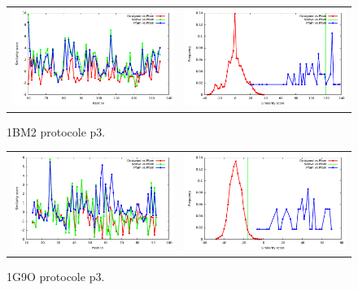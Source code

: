\documentclass[a4paper,12pt]{article}
\begin{document}
   \begin{figure}[t]
     \centering
     \begin{tabular}{cc}
       \includegraphics[width=8.45cm]{gen_08032012/1BM2/p3/similarity_bypos.pdf} &
       \includegraphics[width=8.45cm]{gen_08032012/1BM2/p3/similarity_byseq_frequency.pdf} \\
     \end{tabular}

     \caption{1BM2 protocole p3.}
     \label{1ABO}
   \end{figure}
   \begin{figure}[t]
     \centering
     \begin{tabular}{cc}
       \includegraphics[width=8.45cm]{gen_08032012/1G9O/p3/similarity_bypos.pdf} &
       \includegraphics[width=8.45cm]{gen_08032012/1G9O/p3/similarity_byseq_frequency.pdf} \\
     \end{tabular}
     
     \caption{1G9O protocole p3.}
     \label{1ABO}
   \end{figure}
\end{document}
